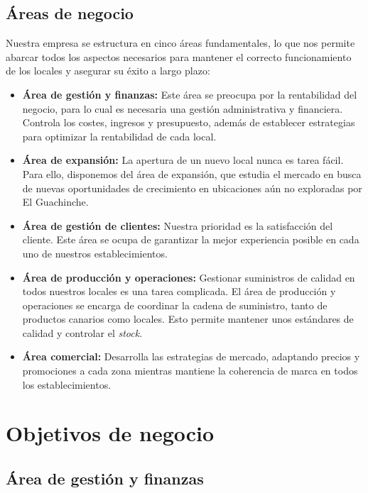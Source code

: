 \documentclass[12pt]{opticajnl}
\begin{document}
\subsection{Áreas de negocio}
Nuestra empresa se estructura en cinco áreas fundamentales, lo que nos permite abarcar todos los aspectos necesarios para mantener el correcto funcionamiento de los locales y asegurar su éxito a largo plazo:

\begin{itemize}
    \item \textbf{Área de gestión y finanzas:} Este área se preocupa por la rentabilidad del negocio, para lo cual es necesaria una gestión administrativa y financiera. Controla los costes, ingresos y presupuesto, además de establecer estrategias para optimizar la rentabilidad de cada local.
    \item \textbf{Área de expansión:} La apertura de un nuevo local nunca es tarea fácil. Para ello, disponemos del área de expansión, que estudia el mercado en busca de nuevas oportunidades de crecimiento en ubicaciones aún no exploradas por El Guachinche.
    \item \textbf{Área de gestión de clientes:} Nuestra prioridad es la satisfacción del cliente. Este área se ocupa de garantizar la mejor experiencia posible en cada uno de nuestros establecimientos.
    \item \textbf{Área de producción y operaciones:} Gestionar suministros de calidad en todos nuestros locales es una tarea complicada. El área de producción y operaciones se encarga de coordinar la cadena de suministro, tanto de productos canarios como locales. Esto permite mantener unos estándares de calidad y controlar el \textit{stock}.
    \item \textbf{Área comercial:} Desarrolla las estrategias de mercado, adaptando precios y promociones a cada zona mientras mantiene la coherencia de marca en todos los establecimientos.
\end{itemize}













\section{Objetivos de negocio}

\subsection{Área de gestión y finanzas}
\end{document}
